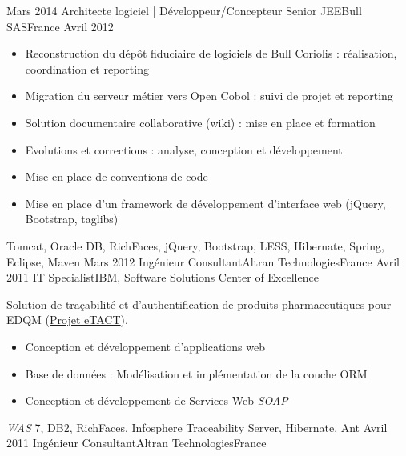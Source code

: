 \begin{experiences}
  \emptySeparator
  \experience
    {Mars 2014}     {Architecte logiciel | Développeur/Concepteur Senior JEE}{Bull SAS}{France}
    {Avril 2012}    {
                      \begin{itemize}
                        \item Reconstruction du dépôt fiduciaire de logiciels de Bull Coriolis : réalisation, coordination et reporting
                        \item Migration du serveur métier vers Open Cobol : suivi de projet et reporting                
                        \item Solution documentaire collaborative (wiki) : mise en place et formation                   
                        \item Evolutions et corrections : analyse, conception et développement                          
                        \item Mise en place de conventions de code                                                      
                        \item Mise en place d'un framework de développement d'interface web (jQuery, Bootstrap, taglibs)
                      \end{itemize}
                    }
                    {Tomcat, Oracle DB, RichFaces, jQuery, Bootstrap, LESS, Hibernate, Spring, Eclipse, Maven}
  \emptySeparator
  \consultantexperience
  {Mars 2012}       {Ingénieur Consultant}{Altran Technologies}{France}
  {Avril 2011}      {IT Specialist}{IBM, Software Solutions Center of Excellence}
                    {
                      Solution de traçabilité et d'authentification de produits pharmaceutiques pour EDQM (\href{https://www.edqm.eu/fr/eTACT-1466.html}{Projet eTACT}).
                      \begin{itemize}
                        \item Conception et développement d'applications web                               
                        \item Base de données : Modélisation et implémentation de la couche ORM            
                        \item Conception et développement de Services Web \emph{SOAP}                      
                      \end{itemize}
                    }
                    {\emph{WAS} 7, DB2, RichFaces, Infosphere Traceability Server, Hibernate, Ant}
  \emptySeparator
  \consultantexperience
  {Avril 2011}      {Ingénieur Consultant}{Altran Technologies}{France}

\end{experiences}
